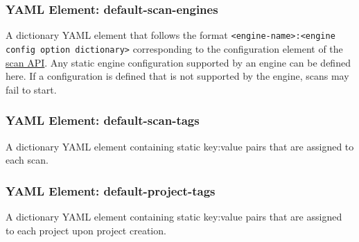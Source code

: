 \subsubsection{YAML Element: default-scan-engines}\label{sec:yaml-scan-config-default-scan-engines}

A dictionary YAML element that follows the format \texttt{<engine-name>:<engine config option dictionary>}
corresponding to the configuration element of the
\href{https://checkmarx.stoplight.io/docs/checkmarx-one-api-reference-guide/branches/main/f601dd9456e80-run-a-scan}{\cxonetext scan API}.
Any static engine configuration supported by an engine can be defined here.  If a configuration is defined that is not supported
by the engine, scans may fail to start.

\subsubsection{YAML Element: default-scan-tags}\label{sec:yaml-scan-config-default-scan-tags}
A dictionary YAML element containing static key:value pairs that are assigned to each scan.

\subsubsection{YAML Element: default-project-tags}\label{sec:yaml-scan-config-default-project-tags}
A dictionary YAML element containing static key:value pairs that are assigned\\to each project upon project creation.

